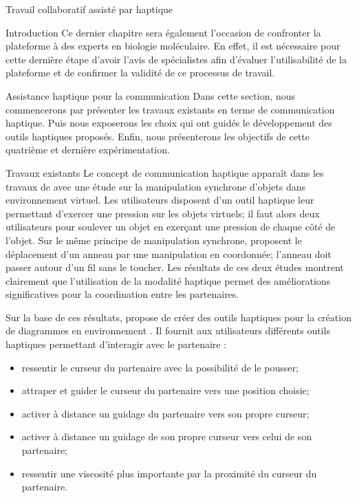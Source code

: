 \documentclass[myfrancais,ngerman,english,french]{mythesis}
\begin{document}
\begin{mychapter}{Travail collaboratif assisté par haptique}
\begin{mysection}{Introduction}
			Ce dernier chapitre sera également l'occasion de confronter la plateforme \myShaddock à des experts en biologie moléculaire.
			En effet, il est nécessaire pour cette dernière étape d'avoir l'avis de spécialistes afin d'évaluer l'utilisabilité de la plateforme et de confirmer la validité de ce processus de travail.
		\end{mysection}
		\begin{mysection}{Assistance haptique pour la communication}
			Dans cette section, nous commencerons par présenter les travaux existants en terme de communication haptique.
			Puis nous exposerons les choix qui ont guidés le développement des outils haptiques proposés.
			Enfin, nous présenterons les objectifs de cette quatrième et dernière expérimentation.
			\begin{mysubsection}{Travaux existants}
				Le concept de communication haptique apparaît dans les travaux de  avec une étude sur la manipulation synchrone d'objets \myThreeD dans environnement virtuel.
				Les utilisateurs disposent d'un outil haptique leur permettant d'exercer une pression sur les objets \myThreeD virtuels; il faut alors deux utilisateurs pour soulever un objet en exerçant une pression de chaque côté de l'objet.
				Sur le même principe de manipulation synchrone,  proposent le déplacement d'un anneau par une manipulation en  coordonnée; l'anneau doit passer autour d'un fil sans le toucher.
				Les résultats de ces deux études montrent clairement que l'utilisation de la modalité haptique permet des améliorations significatives pour la coordination entre les partenaires.

				Sur la base de ces résultats,  propose de créer des outils haptiques pour la création de diagrammes  en environnement \myTwoD.
				Il fournit aux utilisateurs différents outils haptiques permettant d'interagir avec le partenaire :
				\begin{itemize}
					\item ressentir le curseur du partenaire avec la possibilité de le pousser;
					\item attraper et guider le curseur du partenaire vers une position choisie;
					\item activer à distance un guidage du partenaire vers son propre curseur;
					\item activer à distance un guidage de son propre curseur vers celui de son partenaire;
					\item ressentir une viscosité plus importante par la proximité du curseur du partenaire.
				\end{itemize}


\end{mysubsection}
\end{mysection}
\end{mychapter}
\end{document}
